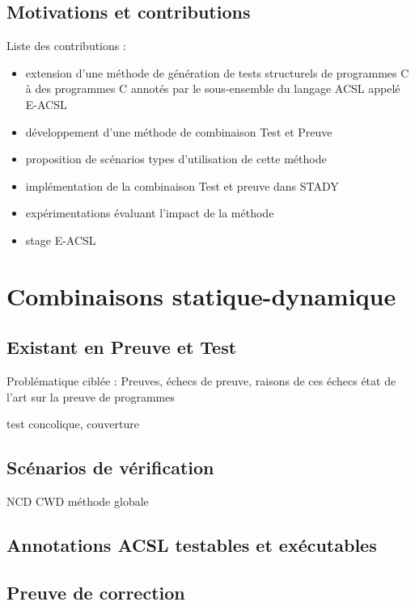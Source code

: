 \documentclass[french]{spimufcphdthesis}
\begin{document}
\chapter{Motivations et contributions}


Liste des contributions :
\begin{itemize}
\item extension d'une méthode de génération de tests structurels de programmes C
  à des programmes C annotés par le sous-ensemble du langage ACSL appelé E-ACSL
\item développement d'une méthode de combinaison Test et Preuve
\item proposition de scénarios types d'utilisation de cette méthode
\item implémentation de la combinaison Test et preuve dans STADY
\item expérimentations évaluant l'impact de la méthode
\item stage E-ACSL
\end{itemize}


\part{Combinaisons statique-dynamique}


\chapter{Existant en Preuve et Test}


Problématique ciblée : Preuves, échecs de
   preuve, raisons de ces échecs état de l'art sur la preuve de programmes
         
         test concolique, couverture


\chapter{Scénarios de vérification}


NCD
CWD
méthode globale


\chapter{Annotations ACSL testables et exécutables}


\chapter{Preuve de correction}
\end{document}
